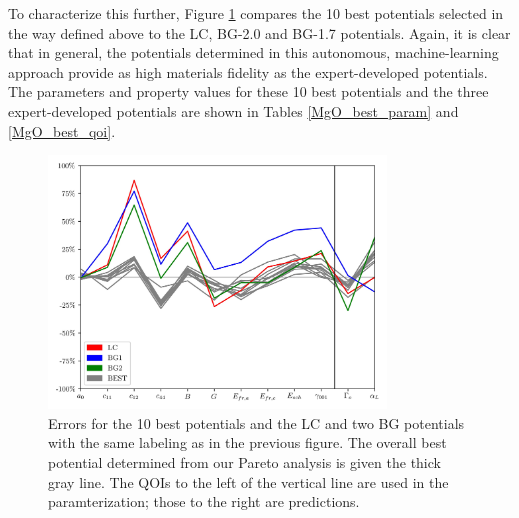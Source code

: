 To characterize this further, Figure \ref{fig:MgO_qoi_parallel_plots} compares the 10 best potentials selected in the way defined above to the LC, BG-2.0 and BG-1.7 potentials. Again, it is clear that in general, the potentials determined in this autonomous, machine-learning approach provide as high materials fidelity as the expert-developed potentials. The parameters and property values for these 10 best potentials and the three expert-developed potentials are shown in Tables \ref{MgO_best_param} and \ref{MgO_best_qoi}.

\begin{figure}[ht]
	\centering
  \includegraphics[width=0.8\textwidth]{chapter7/MgO_qoi_parallel_plots}
  \caption{Errors for the 10 best potentials and the LC and two BG potentials with the same labeling as in the previous figure. The overall best potential determined from our Pareto analysis is given the thick gray line. The QOIs to the left of the vertical line are used in the paramterization; those to the right are predictions.}
  \label{fig:MgO_qoi_parallel_plots}
\end{figure}


